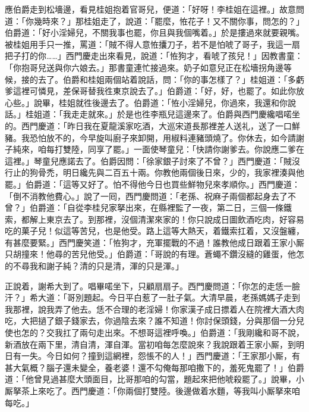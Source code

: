 應伯爵走到松墻邊，看見桂姐抱着官哥兒，便道：「好呀！李桂姐在這裡。」故意問道：「你幾時來？」{}那桂姐走了，說道：「罷麼，恠花子！又不關你事，問怎的？」伯爵道：「好小淫婦兒，不關我事也罷，你且與我個嘴着。」於是摟過來就要親嘴。被桂姐用手只一推，罵道：「賊不得人意恠攮刀子，若不是怕唬了哥子，我這一扇把子打的你……」西門慶走出來看見，說道：「恠狗才，看唬了孩兒！」因教書童：「你抱哥兒送與你六娘去。」那書童連忙接過來。奶子如意兒正在松墻拐角邊等候，接的去了。伯爵和桂姐兩個站着說話，問：「你的事怎樣了？」桂姐道：「多虧爹這裡可憐見，差保哥替我徃東京說去了。」伯爵道：「好，好，也罷了。如此你放心些。」說畢，桂姐就徃後邊去了。伯爵道：「恠小淫婦兒，你過來，我還和你說話。」桂姐道：「我走走就來。」於是也徃李瓶兒這邊來了。伯爵與西門慶纔唱喏坐的。西門慶道：「昨日我在夏龍溪家吃酒，大巡宋道長那裡差人送礼，送了一口鮮豬。{}我恐怕放不的，今早旋叫廚子來卸開，用椒料連豬頭燒了。你休去，如今請謝子純來，咱每打雙陸，同享了罷。」一面使琴童兒：「快請你謝爹去。你說應二爹在這裡。」琴童兒應諾去了。伯爵因問：「徐家銀子討來了不曾？」西門慶道：「賊沒行止的狗骨禿，明日纔先與二百五十兩。你教他兩個後日來，少的，我家裡湊與他罷。」伯爵道：「這等又好了。怕不得他今日也買些鮮物兒來孝順你。」西門慶道：「倒不消教他費心。」說了一囘，西門慶問道：「老孫、祝麻子兩個都起身去了不曾？」伯爵道：「自從李桂兒家拏出來，在縣裡監了一夜，第二日，三個一條鐵索，都解上東京去了。到那裡，沒個清潔來家的！你只說成日圖飲酒吃肉，好容易吃的菓子兒！似這等苦兒，也是他受。路上這等大熱天，着鐵索扛着，又沒盤纏，有甚麼要緊。」{}西門慶笑道：「恠狗才，充軍擺戰的不過！誰教他成日跟着王家小厮只胡撞來！他尋的苦兒他受。」伯爵道：「哥說的有理。蒼蠅不鑽沒縫的雞蛋，他怎的不尋我和謝子純？清的只是清，渾的只是渾。」

正說着，謝希大到了。唱畢喏坐下，只顧扇扇子。西門慶問道：「你怎的走恁一臉汗？」希大道：「哥別題起。今日平白惹了一肚子氣。大清早晨，老孫媽媽子走到我那裡，說我弄了他去。恁不合理的老淫婦！你家漢子成日摽着人在院裡大酒大肉吃，大把撾了銀子錢家去，你過陰去來？誰不知道！你討保頭錢，分與那個一分兒使也怎的？{}交我扛了兩句走出來。不想哥這裡呼喚。」伯爵道：「我剛纔和哥不說，新酒放在兩下里，清自清，渾自渾。當初咱每怎麼說來？我說跟着王家小厮，到明日有一失。今日如何？撞到這網裡，怨悵不的人！」西門慶道：「王家那小厮，有甚大氣概？腦子還未變全，養老婆！還不勾俺每那咱撒下的，羞死鬼罷了！」伯爵道：「他曾見過甚麼大頭面目，比哥那咱的勾當，題起來把他唬殺罷了。」{}說畢，小厮拏茶上來吃了。西門慶道：「你兩個打雙陸。後邊做着水麵，等我叫小厮拏來咱每吃。」


